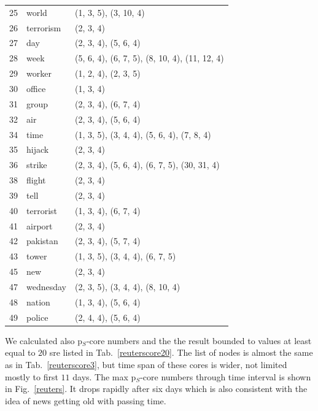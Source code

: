 \documentclass[a4paper,twoside,10pt]{article}
\begin{document}
\begin{center}
\begin{longtable}{p{}p{}p{}}
25 & world          &   (1, 3, 5), (3, 10, 4) \\
26 & terrorism     	&    (2, 3, 4) \\
27 & day          	&     (2, 3, 4), (5, 6, 4) \\
28 & week        	&      (5, 6, 4), (6, 7, 5), (8, 10, 4), (11, 12, 4) \\
29 & worker     	&       (1, 2, 4), (2, 3, 5) \\
30 & office    		&        (1, 3, 4) \\
31 & group    		&         (2, 3, 4), (6, 7, 4) \\
32 & air     		&          (2, 3, 4), (5, 6, 4) \\
34 & time   		&           (1, 3, 5), (3, 4, 4), (5, 6, 4), (7, 8, 4) \\
35 & hijack			&            (2, 3, 4) \\
36 & strike         & (2, 3, 4), (5, 6, 4), (6, 7, 5), (30, 31, 4) \\
38 & flight         &  (2, 3, 4) \\
39 & tell           &   (2, 3, 4) \\
40 & terrorist     	&    (1, 3, 4), (6, 7, 4) \\
41 & airport      	&     (2, 3, 4) \\
42 & pakistan    	&      (2, 3, 4), (5, 7, 4) \\
43 & tower      	&       (1, 3, 5), (3, 4, 4), (6, 7, 5) \\
45 & new       		&        (2, 3, 4) \\
47 & wednesday		&         (2, 3, 5), (3, 4, 4), (8, 10, 4) \\
48 & nation  		&          (1, 3, 4), (5, 6, 4) \\
49 & police 		&		            (2, 4, 4), (5, 6, 4)
\end{longtable}
\end{center}

We calculated also p$_S$-core numbers and the the result bounded to values at least equal to $20$ sre listed in Tab.~\ref{reuterscore20}. The list of nodes is almost the same as in Tab.~\ref{reuterscore3}, but time span of these cores is wider, not limited mostly to first $11$ days. The max p$_S$-core numbers through time interval is shown in Fig.~\ref{reuters}. It drops rapidly after six days which is also consistent with the idea of news getting old with passing time.
\end{document}
